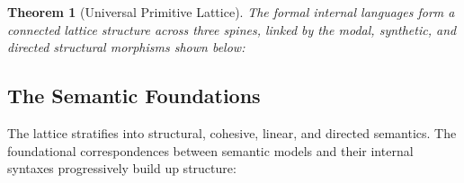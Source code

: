 \documentclass{article}
\theoremstyle{definition}
\theoremstyle{plain}
\newtheorem{theorem}[definition]{Theorem}
\begin{document}
\begin{theorem}[Universal Primitive Lattice]
The formal internal languages form a connected lattice structure across three spines, linked by the modal, synthetic, and directed structural morphisms shown below:
\end{theorem}

\begin{lrbox}{\diagbox}
\scriptsize
{}%
\end{lrbox}
\noindent\makebox[\textwidth][c]{\usebox{\diagbox}}

\newpage
\subsection{The Semantic Foundations}
The lattice stratifies into structural, cohesive, linear, and directed semantics. The foundational correspondences between semantic models and their internal syntaxes progressively build up structure:
\end{document}
